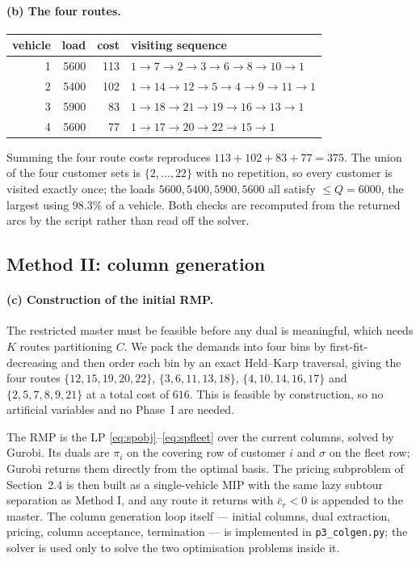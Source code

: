 \documentclass[11pt]{article}
\begin{document}
\paragraph{(b) The four routes.}

\begin{center}
\begin{tabular}{@{}rrrl@{}}
\toprule
vehicle & load & cost & visiting sequence\\
\midrule
1 & 5600 & 113 & $1 \to 7 \to 2 \to 3 \to 6 \to 8 \to 10 \to 1$\\
2 & 5400 & 102 & $1 \to 14 \to 12 \to 5 \to 4 \to 9 \to 11 \to 1$\\
3 & 5900 &  83 & $1 \to 18 \to 21 \to 19 \to 16 \to 13 \to 1$\\
4 & 5600 &  77 & $1 \to 17 \to 20 \to 22 \to 15 \to 1$\\
\bottomrule
\end{tabular}
\end{center}

Summing the four route costs reproduces $113 + 102 + 83 + 77 = 375$.
The union of the four customer sets is $\{2,\dots,22\}$ with no
repetition, so every customer is visited exactly once; the loads
$5600, 5400, 5900, 5600$ all satisfy $\le Q = 6000$, the largest using
$98.3\%$ of a vehicle. Both checks are recomputed from the returned
arcs by the script rather than read off the solver.

\subsection{Method II: column generation}

\paragraph{(c) Construction of the initial RMP.}
The restricted master must be feasible before any dual is meaningful,
which needs $K$ routes partitioning $C$. We pack the demands into four
bins by first-fit-decreasing and then order each bin by an exact
Held--Karp traversal, giving the four routes
$\{12,15,19,20,22\}$, $\{3,6,11,13,18\}$, $\{4,10,14,16,17\}$ and
$\{2,5,7,8,9,21\}$ at a total cost of $616$. This is feasible by
construction, so no artificial variables and no Phase~I are needed.

The RMP is the LP \eqref{eq:spobj}--\eqref{eq:spfleet} over the current
columns, solved by Gurobi. Its duals are $\pi_i$ on the covering row of
customer $i$ and $\sigma$ on the fleet row; Gurobi returns them
directly from the optimal basis. The pricing subproblem of
Section~2.4 is then built as a single-vehicle MIP with the same lazy
subtour separation as Method I, and any route it returns with
$\bar{c}_r < 0$ is appended to the master. The column generation loop
itself --- initial columns, dual extraction, pricing, column
acceptance, termination --- is implemented in
\texttt{p3\_colgen.py}; the solver is used only to solve the two
optimisation problems inside it.
\end{document}
